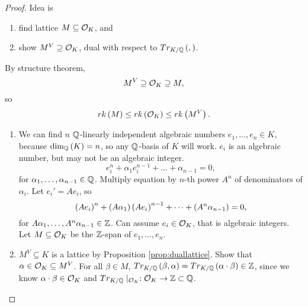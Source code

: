 \begin{proof}
Idea is
\begin{enumerate}
\item find lattice $ M \subseteq \mathcal{O}_K $, and
\item show $ M^V \supseteq \mathcal{O}_K $, dual with respect to $ Tr_{K / \mathbb{Q}}\left( , \right) $.
\end{enumerate}
By structure theorem,
$$ M^V \supseteq \mathcal{O}_K \supseteq M, $$
so
$$ rk\left( M \right) \le rk\left( \mathcal{O}_K \right) \le rk\left( M^V \right). $$
\begin{enumerate}
\item We can find $ n $ $ \mathbb{Q} $-linearly independent algebraic numbers $ e_1, \dots, e_n \in K $, because $ \dim_{\mathbb{Q}}\left( K \right) = n $, so any $ \mathbb{Q} $-basis of $ K $ will work. $ e_i $ is an algebraic number, but may not be an algebraic integer.
$$ e_i^n + \alpha_1e_i^{n - 1} + \dots + \alpha_{n - 1} = 0, $$
for $ \alpha_1, \dots, \alpha_{n - 1} \in \mathbb{Q} $. Multiply equation by $ n $-th power $ A^n $ of denominators of $ \alpha_i $. Let $ e_i' = Ae_i $, so
$$ \left( Ae_i \right)^n + \left( A\alpha_1 \right)\left( Ae_i \right)^{n - 1} + \dots + \left( A^n\alpha_{n - 1} \right) = 0, $$
for $ A\alpha_1, \dots, A^n\alpha_{n - 1} \in \mathbb{Z} $. Can assume $ e_i \in \mathcal{O}_K $, that is algebraic integers. Let $ M \subseteq \mathcal{O}_K $ be the $ \mathbb{Z} $-span of $ e_1, \dots, e_n $.
\item $ M^V \subseteq K $ is a lattice by Proposition \ref{prop:duallattice}. Show that $ \alpha \in \mathcal{O}_K \subseteq M^V $. For all $ \beta \in M $, $ Tr_{K / \mathbb{Q}}\left( \beta, \alpha \right) = Tr_{K / \mathbb{Q}}\left( \alpha \cdot \beta \right) \in \mathbb{Z} $, since we know $ \alpha \cdot \beta \in \mathcal{O}_K $ and $ Tr_{K / \mathbb{Q}} \mid_{\mathcal{O}_K} : \mathcal{O}_K \to \mathbb{Z} \subset \mathbb{Q} $.
\end{enumerate}
\end{proof}

